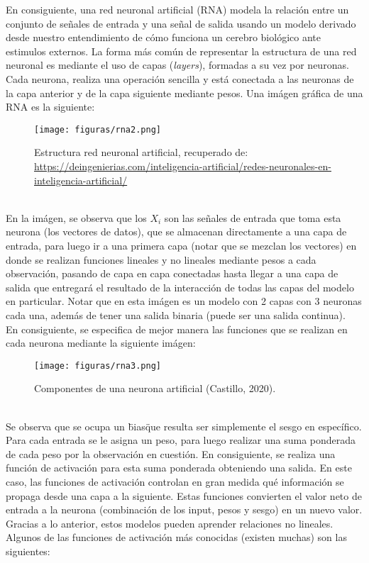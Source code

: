 \documentclass{report}
\begin{document}
En consiguiente, una red neuronal artificial (RNA) modela la relación entre un conjunto de señales de entrada y una señal de salida usando un modelo derivado desde nuestro entendimiento de cómo funciona un cerebro biológico ante estimulos externos. La forma más común de representar la estructura de una red neuronal es mediante el uso de capas (\textit{layers}), formadas a su vez por neuronas. Cada neurona, realiza una operación sencilla y está conectada a las neuronas de la capa anterior y de la capa siguiente mediante pesos. Una imágen gráfica de una RNA es la siguiente:\\

\begin{figure}[htp]
        \centering
    	\texttt{[image: figuras/rna2.png]}
    	\label{fig: Figura1}
    	\caption{Estructura red neuronal artificial, recuperado de: \url{https://deingenierias.com/inteligencia-artificial/redes-neuronales-en-inteligencia-artificial/}}
        \end{figure}\\

En la imágen, se observa que los $X_{i}$ son las señales de entrada que toma esta neurona (los vectores de datos), que se almacenan directamente a una capa de entrada, para luego ir a una primera capa (notar que se mezclan los vectores) en donde se realizan funciones lineales y no lineales mediante pesos a cada observación, pasando de capa en capa conectadas hasta llegar a una capa de salida que entregará el resultado de la interacción de todas las capas del modelo en particular. Notar que en esta imágen es un modelo con 2 capas con 3 neuronas cada una, además de tener una salida binaria (puede ser una salida continua).\\

En consiguiente, se especifica de mejor manera las funciones que se realizan en cada neurona mediante la siguiente imágen:\\
\vspace{4cm}

\begin{figure}[htp]
        \centering
    	\texttt{[image: figuras/rna3.png]}
    	\label{fig: Figura1}
    	\caption{Componentes de una neurona artificial (Castillo, 2020).}
        \end{figure}\\

Se observa que se ocupa un \"bias\" que resulta ser simplemente el sesgo en específico. Para cada entrada se le asigna un peso, para luego realizar una suma ponderada de cada peso por la observación en cuestión. En consiguiente, se realiza una función de activación para esta suma ponderada obteniendo una salida. En este caso, las funciones de activación controlan en gran medida qué información se propaga desde una capa a la siguiente. Estas funciones convierten el valor neto de entrada a la neurona (combinación de los input, pesos y sesgo) en un nuevo valor. Gracias a lo anterior, estos modelos pueden aprender relaciones no lineales. Algunos de las funciones de activación más conocidas (existen muchas) son las siguientes:\\        
        
\end{document}
